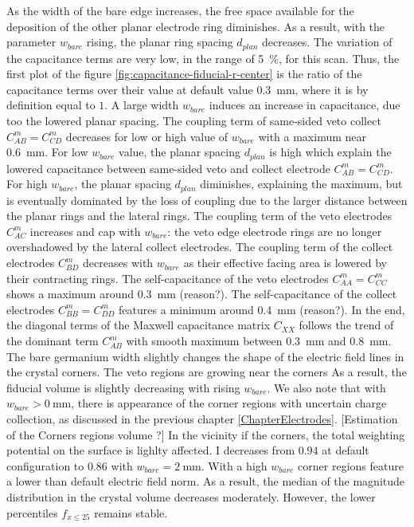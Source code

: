 As the width of the bare edge increases, the free space available for the deposition of the other planar electrode ring diminishes. As a result, with the parameter $w_{bare}$ rising, the planar ring spacing $d_{plan}$ decreases.  
The variation of the capacitance terms are very low, in the range of \SI{5}{\percent}, for this scan. Thus, the first plot of the figure \ref{fig:capacitance-fiducial-r-center} is the ratio of the capacitance terms over their value at default value \SI{0.3}{\mm}, where it is by definition equal to $1$. A large width $w_{bare}$ induces an increase in capacitance, due too the lowered planar spacing.
The coupling term of same-sided veto collect $C_{AB}^m=C_{CD}^m$ decreases for low or high value of $w_{bare}$ with a maximum near \SI{0.6}{\mm}. For low $w_{bare}$ value, the planar spacing $d_{plan}$ is high which explain the lowered capacitance between same-sided veto and collect electrode $C_{AB}^m=C_{CD}^m$. For high $w_{bare}$, the planar spacing $d_{plan}$ diminishes, explaining the maximum, but is eventually dominated by the loss of coupling due to the larger distance between the planar rings and the lateral rings. The coupling term of the veto electrodes $C_{AC}^m$ increases and cap with $w_{bare}$: the veto edge electrode rings are no longer overshadowed by the lateral collect electrodes. The coupling term of the collect electrodes $C_{BD}^m$ decreases with $w_{bare}$ as their effective facing area is lowered by their contracting rings. The self-capacitance of the veto electrodes $C_{AA}^m = C_{CC}^m$ shows a maximum around \SI{0.3}{\mm} (reason?). The self-capacitance of the collect electrodes $C_{BB}^m = C_{DD}^m$ features a minimum around \SI{0.4}{\mm} (reason?). In the end, the diagonal terms of the Maxwell capacitance matrix $C_{XX}$ follows the trend of the dominant term $C_{AB}^m$ with smooth maximum between 
\SI{0.3}{\mm} and \SI{0.8}{\mm}.
The bare germanium width slightly changes the shape of the electric field lines in the crystal corners. The veto regions are growing near the corners As a result, the fiducial volume is slightly decreasing with rising $w_{bare}$. We also note that with $w_{bare} > \SI{0}{\mm}$, there is appearance of the corner regions with uncertain charge collection, as discussed in the previous chapter \ref{ChapterElectrodes}. {\color{red} [Estimation of the Corners regions volume ?]}
In the vicinity if the corners, the total weighting potential on the surface is lighlty affected. I decreases from $0.94$ at default configuration to $0.86$ with $w_{bare} = \SI{2}{\mm}$.
With a high $w_{bare}$ corner regions feature a lower than default electric field norm. As a result, the median of the magnitude distribution in the crystal volume decreases moderately. However, the lower percentiles $f_{x \leq 25}$ remains stable.

